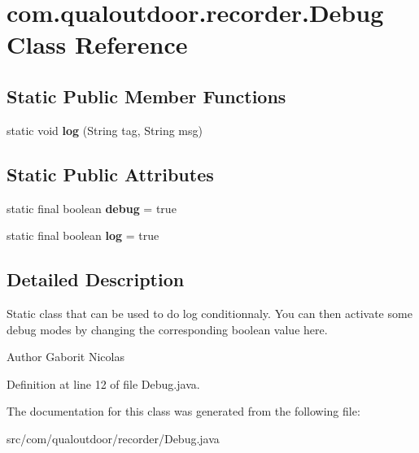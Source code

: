 \hypertarget{classcom_1_1qualoutdoor_1_1recorder_1_1Debug}{\section{com.\-qualoutdoor.\-recorder.\-Debug Class Reference}
\label{classcom_1_1qualoutdoor_1_1recorder_1_1Debug}
}
\subsection*{Static Public Member Functions}
\begin{DoxyCompactItemize}
\item 
\hypertarget{classcom_1_1qualoutdoor_1_1recorder_1_1Debug_a29988213666e2421bac5c4bc01b30519}{static void {\bfseries log} (String tag, String msg)}\label{classcom_1_1qualoutdoor_1_1recorder_1_1Debug_a29988213666e2421bac5c4bc01b30519}

\end{DoxyCompactItemize}
\subsection*{Static Public Attributes}
\begin{DoxyCompactItemize}
\item 
\hypertarget{classcom_1_1qualoutdoor_1_1recorder_1_1Debug_a28540fc80836f570241e4b00a3c3711e}{static final boolean {\bfseries debug} = true}\label{classcom_1_1qualoutdoor_1_1recorder_1_1Debug_a28540fc80836f570241e4b00a3c3711e}

\item 
\hypertarget{classcom_1_1qualoutdoor_1_1recorder_1_1Debug_a022c8b4f800f5a459e9030826b8aa831}{static final boolean {\bfseries log} = true}\label{classcom_1_1qualoutdoor_1_1recorder_1_1Debug_a022c8b4f800f5a459e9030826b8aa831}

\end{DoxyCompactItemize}


\subsection{Detailed Description}
Static class that can be used to do log conditionnaly. You can then activate some debug modes by changing the corresponding boolean value here.

\begin{DoxyAuthor}{Author}
Gaborit Nicolas 
\end{DoxyAuthor}


Definition at line 12 of file Debug.\-java.



The documentation for this class was generated from the following file\-:\begin{DoxyCompactItemize}
\item 
src/com/qualoutdoor/recorder/Debug.\-java\end{DoxyCompactItemize}
